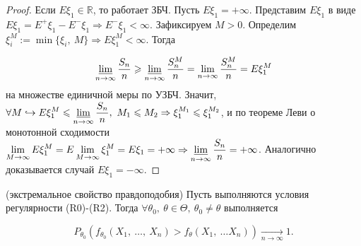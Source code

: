 \begin{proof}
    Если $\displaystyle E\xi _{1} \in \mathbb{R}$, то работает ЗБЧ. Пусть $\displaystyle E\xi _{1} =+\infty $. Представим $\displaystyle E\xi _{1}$ в виде $\displaystyle E\xi _{1} =E^{+} \xi _{1} -E^{-} \xi _{1} \Rightarrow E^{-} \xi _{1} < \infty $. Зафиксируем $\displaystyle M >0$. Определим $\displaystyle \xi _{i}^{M} :=\min\{\xi _{i} ,\ M\} \Rightarrow E\xi _{1}^{M} < \infty $. Тогда
    
    
    \begin{equation*}
        \varliminf _{n\rightarrow \infty }\dfrac{S_{n}}{n} \geqslant \varliminf _{n\rightarrow \infty }\dfrac{S_{n}^{M}}{n} =\lim _{n\rightarrow \infty }\dfrac{S_{n}^{M}}{n} =E\xi _{1}^{M}
    \end{equation*}
    на множестве единичной меры по УЗБЧ. Значит, $\displaystyle \forall M\hookrightarrow E\xi _{1}^{M} \leqslant \varliminf _{n\rightarrow \infty }\dfrac{S_{n}}{n} ,\ M_{1} \leqslant M_{2} \Rightarrow \xi _{1}^{M_{1}} \leqslant \xi _{1}^{M_{2}}$, и по теореме Леви о монотонной сходимости $\displaystyle \lim _{M\rightarrow \infty } E\xi _{1}^{M} =E\lim _{M\rightarrow \infty } \xi _{1}^{M} =E\xi _{1} =+\infty \Rightarrow \varliminf _{n\rightarrow \infty }\dfrac{S_{n}}{n} =+\infty $. Аналогично доказывается случай $\displaystyle E\xi _{1} =-\infty $.
\end{proof}
\begin{theorem}
    (экстремальное свойство правдоподобия) Пусть выполняются условия регулярности (R0)-(R2). Тогда $\displaystyle \forall \theta _{0} ,\ \theta \in \Theta ,\ \theta _{0} \neq \theta $ выполняется
    
    
    \begin{equation*}
        P_{\theta _{0}}( f_{\theta _{0}}( X_{1} ,\ \dotsc ,\ X_{n})  >f_{\theta }( X_{1} ,\ \dotsc X_{n}))\xrightarrow[n\rightarrow \infty ]{} 1.
    \end{equation*}
\end{theorem}
